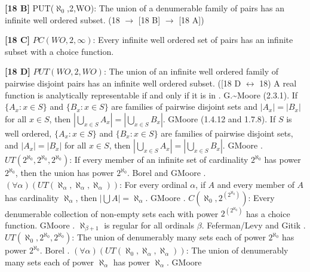 \smallskip
\item{}{\bf [18 B]} PUT($\aleph_0$,2,WO): The union of a
denumerable family of pairs has an infinite well ordered subset. (18 $\to$ [18 B] $\to$
[18 A])
\smallskip
\item{}{\bf [18 C]} $PC(WO,2,\infty)$:  Every infinite well ordered
set of  pairs has an infinite subset with a choice function.
\smallskip
\item{}{\bf [18 D]} $PUT(WO,2,WO)$: The union of an infinite well ordered
family of pairwise disjoint pairs has an infinite well ordered subset.
([18 D $\leftrightarrow$ 18)
\medskip
{} A real function is analytically representable if
and only if it is in . \ac{G.~Moore}
\cite{1982} (2.3.1).
\medskip
{} If $\{A_{x}: x \in S \}$ and $\{B_{x}:
x \in  S\}$ are families  of pairwise disjoint sets and $ |A_{x}|
= |B_{x}|$ for all $x\in S$, then $|\bigcup_{x\in S}A_{x}| =
|\bigcup_{x\in S} B_{x}|$. G\. \ac{Moore} \cite{1982} (1.4.12 and 1.7.8).
\medskip
{} If $S$ is well ordered, $\{A_{x}: x\in S\}$ and
$\{B_{x}: x\in S\}$ are families of pairwise disjoint sets, and
$|A_{x}| = |B_{x}|$ for all $x\in S$, then $|\bigcup_{x\in S}A_{x}|=
|\bigcup_{x\in S} B_{x}|$. G\. \ac{Moore} \cite{1982}.
\medskip
{} $UT(2^{\aleph_{0}},2^{\aleph_{0}},2^{\aleph_{0}})$:
If every member of an infinite  set of cardinality $2^{\aleph _{0}}$ has
power $2^{\aleph_{0}}$, then the union has power $2^{\aleph_{0}}$.
\ac{Borel} \cite{1898} and G\. \ac{Moore} \cite{1982}.
\medskip
{} $(\forall \alpha)(UT(\aleph_{\alpha},\aleph_{\alpha},
\aleph_{\alpha}))$: For every ordinal $\alpha$, if $A$ and every member
of $A$ has cardinality $\aleph_{\alpha}$, then $|\bigcup A| =
\aleph _{\alpha }$.  G\. \ac{Moore} \cite{1982}.
\medskip
{} $C(\aleph_0,2^{(2^{\aleph_0})})$: Every denumerable
collection of non-empty sets each with power $2^{(2^{\aleph_{0}})}$
has a choice function. G\. \ac{Moore} \cite{1982}.
\medskip
{} $\aleph _{\beta +1}$ is regular for all ordinals
$\beta$.  \ac{Feferman/Levy} \cite{1963} and \ac{Gitik} \cite{1980}.
\medskip
{} $UT(\aleph_{0},2^{\aleph_{0}},2^{\aleph_{0}})$: The
union of denumerably many sets each of power $2^{\aleph _{0}}$ has power
$2^{\aleph_{0}}$.  \ac{Borel} \cite{1898}.
\medskip
{} $(\forall \alpha)( UT(\aleph_{0},\aleph_{\alpha},
\aleph_{\alpha}))$: The  union of denumerably many sets each of power
$\aleph_{\alpha }$ has power $\aleph_{\alpha}$. G\. \ac{Moore}
